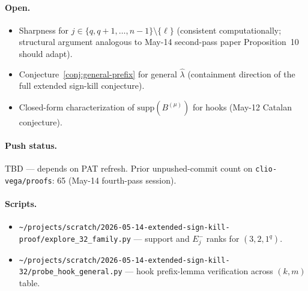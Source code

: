 \documentclass[11pt]{article}
\theoremstyle{definition}
\newcommand{\hatl}{\widehat\lambda}
\newcommand{\supp}{\mathrm{supp}}
\begin{document}
\paragraph{Open.}
\begin{itemize}[topsep=0.3em,itemsep=0.1em]
\item Sharpness for $j \in \{q, q + 1, \ldots, n - 1\} \setminus
  \{\ell\}$ (consistent computationally; structural argument analogous
  to May-14 second-pass paper Proposition~10 should adapt).
\item Conjecture~\ref{conj:general-prefix} for general $\hatl$
  (containment direction of the full extended sign-kill conjecture).
\item Closed-form characterization of $\supp(B^{(\mu)})$ for hooks
  (May-12 Catalan conjecture).
\end{itemize}

\paragraph{Push status.}
TBD --- depends on PAT refresh.  Prior unpushed-commit count on
\texttt{clio-vega/proofs}: 65 (May-14 fourth-pass session).

\paragraph{Scripts.}
\begin{itemize}[topsep=0.3em,itemsep=0.1em]
\item \texttt{\textasciitilde/projects/scratch/2026-05-14-extended-sign-kill-proof/explore\_32\_family.py}
  --- support and $E_j^-$ ranks for $(3, 2, 1^q)$.
\item \texttt{\textasciitilde/projects/scratch/2026-05-14-extended-sign-kill-32/probe\_hook\_general.py}
  --- hook prefix-lemma verification across $(k, m)$ table.
\end{itemize}
\end{document}
